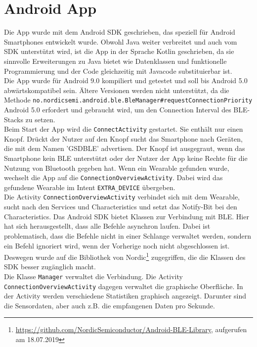 \section{Android App}
Die App wurde mit dem Android SDK geschrieben, das speziell für Android Smartphones entwickelt wurde.
Obwohl Java weiter verbreitet und auch vom SDK unterstützt wird, ist die App in der Sprache Kotlin geschrieben, da sie sinnvolle Erweiterungen zu Java bietet wie Datenklassen und funktionelle Programmierung und der Code gleichzeitig mit Javacode substituierbar ist.\\
Die App wurde für Android 9.0 kompiliert und getestet und soll bis Android 5.0 abwärtskompatibel sein.
Ältere Versionen werden nicht unterstützt, da die Methode \texttt{no.\allowbreak{}nordicsemi.\allowbreak{}android.\allowbreak{}ble.\allowbreak{}BleManager\#\allowbreak{}requestConnectionPriority} Android 5.0 erfordert und gebraucht wird, um den Connection Interval des BLE-Stacks zu setzen.\\
Beim Start der App wird die \texttt{ConnectActivity} gestartet.
Sie enthält nur einen Knopf.
Drückt der Nutzer auf den Knopf sucht das Smartphone nach Geräten, die mit dem Namen 'GSDBLE' advertisen.
Der Knopf ist ausgegraut, wenn das Smartphone kein BLE unterstützt oder der Nutzer der App keine Rechte für die Nutzung von Bluetooth gegeben hat.
Wenn ein Wearable gefunden wurde, wechselt die App auf die \texttt{ConnectionOverviewActivity}.
Dabei wird das gefundene Wearable im Intent \texttt{EXTRA\_DEVICE} übergeben.\\
Die Activity \texttt{ConnectionOverviewActivity} verbindet sich mit dem Wearable, sucht nach den Services und Characteristics und setzt das Notify-Bit bei den Characteristics.
Das Android SDK bietet Klassen zur Verbindung mit BLE.
Hier hat sich herausgestellt, dass alle Befehle asynchron laufen.
Dabei ist problematisch, dass die Befehle nicht in einer Schlange verwaltet werden, sondern ein Befehl ignoriert wird, wenn der Vorherige noch nicht abgeschlossen ist.
Deswegen wurde auf die Bibliothek von Nordic\footnote{\url{https://github.com/NordicSemiconductor/Android-BLE-Library}, aufgerufen am 18.07.2019} zugegriffen, die die Klassen des SDK besser zugänglich macht.\\
Die Klasse \texttt{Manager} verwaltet die Verbindung.
Die Activity \texttt{ConnectionOverviewActivity} dagegen verwaltet die graphische Oberfläche.
In der Activity werden verschiedene Statistiken graphisch angezeigt.
Darunter sind die Sensordaten, aber auch z.B. die empfangenen Daten pro Sekunde.
